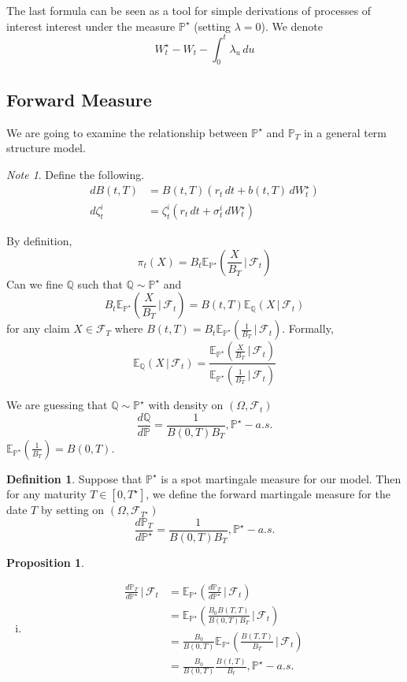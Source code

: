 \documentclass[10pt, oneside, reqno]{amsbook}
\theoremstyle{plain}%
\newtheorem{prop}[thm]{Proposition}
\theoremstyle{definition}
\newtheorem{defn}[thm]{Definition}
\theoremstyle{remark}
\newtheorem*{note}{Note}
\newcommand{\given}{ \, | \,}
\newcommand{\sigf}{\mathcal{F}}
\newcommand{\Q}{\mathbb{Q}}
\newcommand{\E}{\mathbb{E}}
\renewcommand{\P}{\mathbb{P}}
\numberwithin{equation}{chapter}
\begin{document}
The last formula can be seen as a tool for simple derivations of processes of interest interest under the measure $\P^\star$ (setting $\lambda = 0$).  We denote \[
	W^\star_t - W_t - \int_0^t \lambda_u \, du
\] 

\subsection{Forward Measure} %
\label{sub:forward_measure}
We are going to examine the relationship between $\P^\star$ and $\P_T$ in a general term structure model.

\begin{note}
	Define the following.
	\begin{align*}
		dB(t, T) &= B(t, T) \left(r_t \, dt + b(t, T) \, dW^\star_t \right) \\
		d \zeta^i_t &= \zeta^i_t \left(r_t \, dt + \sigma^i_t \, dW^\star_t \right)
	\end{align*}
\end{note}

By definition, \[
	\pi_t(X) = B_t \E_{\P^\star} \left( \frac{X}{B_T} \given \sigf_t \right)
\]  Can we fine $\Q$ such that $\Q \sim \P^\star$ and \[
	B_t \E_{\P^\star} \left( \frac{X}{B_T} \given \sigf_t \right) = B(t, T) \E_\Q \left( X \given \sigf_t \right)
\] for any claim $X \in \sigf_T$ where $B(t, T) = B_t\E_{\P^\star} \left( \frac{1}{B_T} \given \sigf_t \right)$.  Formally, \[
	\E_{\Q} \left( X \given \sigf_t \right) = \frac{\E_{\P^\star} \left( \frac{X}{B_T} \given \sigf_t \right)}{\E_{\P^\star} \left( \frac{1}{B_T} \given \sigf_t \right)}
\]

We are guessing that $\Q \sim \P^\star$ with density on $(\Omega, \sigf_t)$ \[
	\frac{d\Q}{d \P} = \frac{1}{B(0, T) B_T}, \P^\star-a.s.
\]  $\E_{\P^\star} \left(\frac{1}{B_T} \right) = B(0, T)$.

\begin{defn}
	Suppose that $\P^\star$ is a spot martingale measure for our model.  Then for any maturity $T \in [0, T^\star]$, we define the forward martingale measure for the date $T$ by setting on $(\Omega, \sigf_{T^\star})$ \[
		\frac{d\P_T}{d\P^\star} = \frac{1}{B(0, T) B_T}, \P^\star-a.s.
	\]
\end{defn}

\begin{prop}{\ }
	\begin{enumerate}[(i)]
		\item \begin{align*}
			\frac{d\P_T}{d\P^\star} \given \sigf_t &= \E_{\P^\star} \left( \frac{d\P_T}{d\P^\star} \given \sigf_t \right) \\
				&= \E_{\P^\star} \left( \frac{B_0 B(T, T)}{B(0, T) B_T} \given \sigf_t \right) \\
				&= \frac{B_0}{B(0, T)} \E_{\P^\star} \left( \frac{B(T, T)}{B_T} \given \sigf_t \right) \\
				&= \frac{B_0}{B(0, T)} \frac{B(t, T)}{B_t}, \P^\star-a.s.
		\end{align*}
	\end{enumerate} 
\end{prop}
\end{document}
